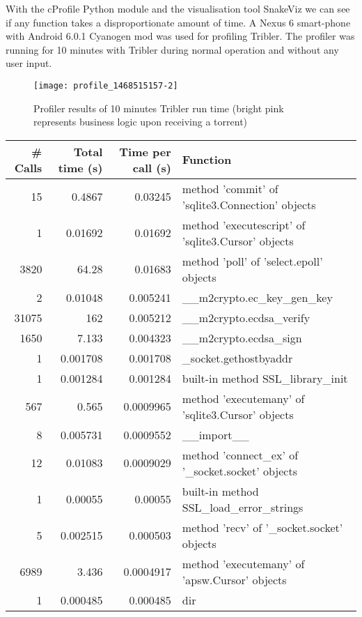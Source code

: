With the cProfile Python module and the visualisation tool SnakeViz we can see if any function takes a disproportionate amount of time.
A Nexus 6 smart-phone with Android 6.0.1 Cyanogen mod was used for profiling Tribler.
The profiler was running for 10 minutes with Tribler during normal operation and without any user input.
\begin{figure}[H]
	\centering
	\texttt{[image: profile\_1468515157-2]}
	\caption{Profiler results of 10 minutes Tribler run time (bright pink represents business logic upon receiving a torrent)}
	\label{fig:profile}
\end{figure}
\begin{table}
	\begin{tabular}{*{3}{r} | l} \hline
		\# Calls & Total time (s) & Time per call (s) & Function \\ \hline \hline
		15 & 0.4867 & 0.03245 & method 'commit' of 'sqlite3.Connection' objects \\ \hline
		1 & 0.01692 & 0.01692 & method 'executescript' of 'sqlite3.Cursor' objects \\ \hline
		3820 & 64.28 & 0.01683 & method 'poll' of 'select.epoll' objects \\ \hline
		2 & 0.01048 & 0.005241 & \_\_m2crypto.ec\_key\_gen\_key \\ \hline
		31075 & 162 & 0.005212 & \_\_m2crypto.ecdsa\_verify \\ \hline
		1650 & 7.133 & 0.004323 & \_\_m2crypto.ecdsa\_sign \\ \hline
		1 & 0.001708 & 0.001708 & \_socket.gethostbyaddr \\ \hline
		1 & 0.001284 & 0.001284 & built-in method SSL\_library\_init \\ \hline
		567 & 0.565 & 0.0009965 & method 'executemany' of 'sqlite3.Cursor' objects \\ \hline
		8 & 0.005731 & 0.0009552 & \_\_import\_\_ \\ \hline
		12 & 0.01083 & 0.0009029 & method 'connect\_ex' of '\_socket.socket' objects \\ \hline
		1 & 0.00055 & 0.00055 & built-in method SSL\_load\_error\_strings \\ \hline
		5 & 0.002515 & 0.000503 & method 'recv' of '\_socket.socket' objects \\ \hline
		6989 & 3.436 & 0.0004917 & method 'executemany' of 'apsw.Cursor' objects \\ \hline
		1 & 0.000485 & 0.000485 & dir \\ \hline

\end{tabular}
\end{table}
